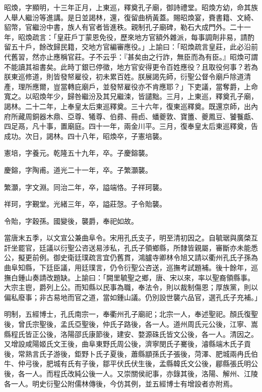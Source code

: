 \begin{pinyinscope}
昭煥，字顯明，十三年正月，上東巡，釋奠孔子廟，御詩禮堂。昭煥方幼，命其族人舉人繼汾等進講。是日並謁林，還，復留曲柄黃蓋。賜昭煥宴，賚書籍、文綺、貂幣，官繼汾中書，族人有官者皆進秩。親制孔子廟碑，勒石大成門外。二十一年，昭煥疏言：「皇莊戶丁蒙恩免役，歷來地方官額外雜派，每事調劑非易，請酌留五十戶，餘改歸民籍，交地方官編審應役。」上諭曰：「昭煥疏言皇莊，此必沿前代舊習，然亦止應稱官莊。子不云乎：『甚矣由之行詐，無臣而為有臣。』昭煥可謂不能讀其祖書矣。此時丁銀已停徵，地方官安得更令百姓應役？且取役何事？若為朕東巡修道，則皆發帑雇役，初未累百姓。朕展謁先師，衍聖公督令廟戶除道清產，理所應爾，豈當轉庇廟戶，並發帑雇役亦不肯應耶？」下吏議，當奪爵，上命寬之。以昭煥年少，歸咎繼汾及其兄繼涑，皆譴黜。三月，上東巡，釋奠孔子廟，謁林。二十二年，上奉皇太后東巡釋奠。三十六年，復東巡釋奠。既還京師，出內府所藏周銅器木鼎、亞尊、犧尊、伯彞、冊卣、蟠夔敦、寶簠、夔鳳豆、饕餮甗、四足鬲，凡十事，置廟庭。四十一年，兩金川平。三月，復奉皇太后東巡釋奠，告成功。次日，謁林。四十八年，昭煥卒，子憲培襲。

憲培，字養元。乾隆五十九年，卒。子慶鎔襲。

慶鎔，字陶甫。道光二十一年，卒。子繁灝襲。

繁灝，字文淵。同治二年，卒，謚端恪。子祥珂襲。

祥珂，字覲堂。光緒三年，卒，謚莊愨。子令貽襲。

令貽，字穀孫。國變後，襲爵，奉祀如故。

當唐末五季，以文宣公兼曲阜令。宋用孔氏支子，明至清初因之。自毓琚與廣棨互訐坐罷官，廷議以衍聖公咨送易涉私，孔氏子領鄉縣，所隸皆親屬，審斷亦未能悉公，擬更前例。御史衛廷璞疏言宜仍舊貫，鴻臚寺卿林令旭又請以衢州孔氏子孫為曲阜知縣，下廷臣議，用廷璞言，仍令衍聖公咨送，巡撫考試題補。後十餘年，巡撫白鍾山奏請改題缺。上諭曰：「闕里毓聖之鄉，唐、宋以來，率以聖裔領縣事。大宗主鬯，爵列上公。而知縣以民事為職，奉法令，則以裁制傷恩；厚族黨，則以偏私廢事；非古易地而官之道，當如鍾山議。仍別設世襲六品官，選孔氏子充補。」

明制，五經博士，孔氏南宗一，奉衢州孔子廟祀；北宗一人，奉述聖祀。顏氏復聖後，曾氏宗聖後，孟氏亞聖後，仲氏子路後，各一人。道州周氏元公後，江寧、嵩縣程氏皆正公後，洛陽邵氏康節後，建安、婺源硃氏皆文公後，各一人。清因之。又增設咸陽姬氏文王後，曲阜東野氏周公後，濟寧閔氏子騫後，濬縣端木氏子貢後，常熟言氏子游後，鉅野卜氏子夏後，蕭縣顓孫氏子張後，菏澤、肥城兩冉氏伯牛、仲弓後，肥城有氏有子後，鄒平伏氏伏生後，孟縣韓氏文公後，郿縣張氏明公後，各一人。而程氏改純公後一人。又崇關侯祀事，亦錄其後，洛陽、解州、江陵各一人。明史衍聖公附儒林傳後，今仿其例，並五經博士有增設者亦附焉。


\end{pinyinscope}
